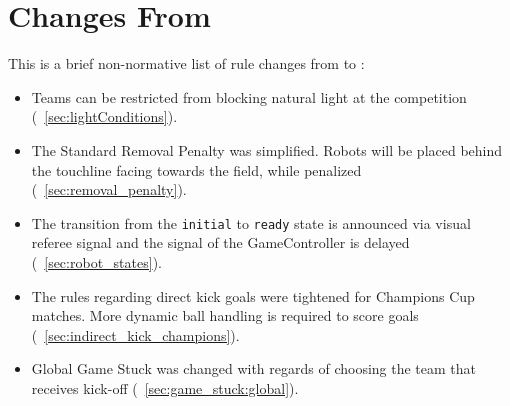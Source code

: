 \section{Changes From \LastRCYear}

This is a brief non-normative list of rule changes from \LastRCYear to \RCYear:
\begin{itemize}
  \item Teams can be restricted from blocking natural light at the competition (\cf~\cref{sec:lightConditions}).
  \item The Standard Removal Penalty was simplified. Robots will be placed behind the touchline facing towards the field, while penalized (\cf~\cref{sec:removal_penalty}).
  \item The transition from the \texttt{initial} to \texttt{ready} state is announced via visual referee signal and the signal of the GameController is delayed (\cf~\cref{sec:robot_states}).
  \item The rules regarding direct kick goals were tightened for Champions Cup matches. More dynamic ball handling is required to score goals (\cf~\cref{sec:indirect_kick_champions}).
  \item Global Game Stuck was changed with regards of choosing the team that receives kick-off (\cf~\cref{sec:game_stuck:global}).
\end{itemize}
